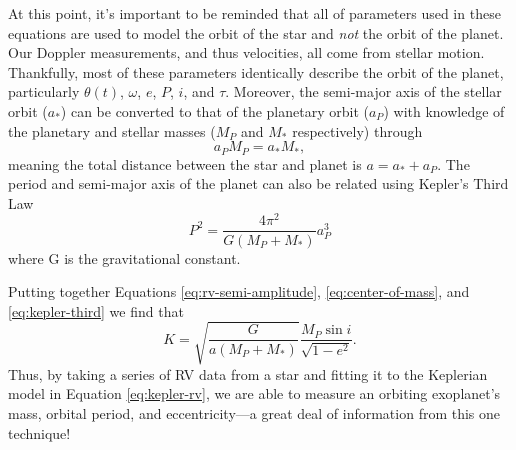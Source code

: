 At this point, it's important to be reminded that all of parameters used in these equations are used to model the orbit of the star and \textit{not} the orbit of the planet. Our Doppler measurements, and thus velocities, all come from stellar motion. Thankfully, most of these parameters identically describe the orbit of the planet, particularly $\theta(t)$, $\omega$, $e$, $P$, $i$, and $\tau$. Moreover, the semi-major axis of the stellar orbit ($a_*$) can be converted to that of the planetary orbit ($a_P$) with knowledge of the planetary and stellar masses ($M_P$ and $M_*$ respectively) through
\begin{equation}
    a_P M_P = a_* M_*,
    \label{eq:center-of-mass}
\end{equation}
meaning the total distance between the star and planet is $a = a_* + a_P$. The period and semi-major axis of the planet can also be related using Kepler's Third Law
\begin{equation}
    P^2 = \frac{4\pi^2}{G (M_P+M_*)} a_P^3
    \label{eq:kepler-third}
\end{equation}
where G is the gravitational constant.

Putting together Equations \ref{eq:rv-semi-amplitude}, \ref{eq:center-of-mass}, and \ref{eq:kepler-third} we find that 
\begin{equation}
    K = \sqrt{ \frac{G}{a (M_P + M_*)}} \frac{M_P \sin{i}}{\sqrt{1-e^2}}.
    \label{eq:rv-semi-amplitude2}
\end{equation}
Thus, by taking a series of RV data from a star and fitting it to the Keplerian model in Equation \ref{eq:kepler-rv}, we are able to measure an orbiting exoplanet's mass, orbital period, and eccentricity---a great deal of information from this one technique!

